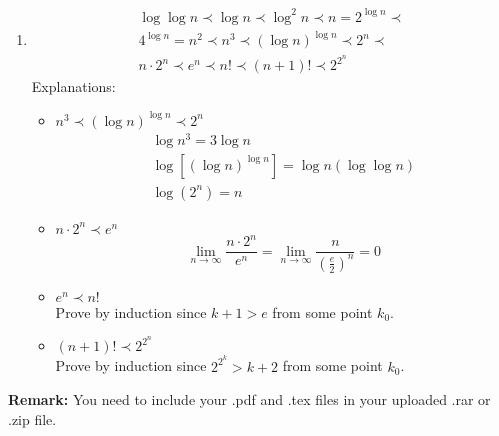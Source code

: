 \documentclass[12pt,a4paper]{article}
\makeatletter
\newtheorem*{solution}{Solution}
\theoremstyle{definition}
\renewenvironment{solution}[1][Solution] {\par\pushQED{\qed}\normalfont\topsep6\p@\@plus6\p@\relax\trivlist\item[\hskip\labelsep\bfseries#1\@addpunct{.}]\ignorespaces}{\popQED\endtrivlist\@endpefalse} \makeatother
\makeatother
\begin{document}
\begin{enumerate}
    \begin{solution}
    	\hfill \break
    	\begin{multline*}
	    	\log \log n \prec \log n \prec \log^2 n \prec n = 2^{\log n} \prec \\ 
	    	4^{\log n} = n^2 \prec n^3 \prec (\log n)^{\log n} \prec  2^n \prec \\
			n \cdot 2^n \prec e^n \prec n! \prec (n + 1)! \prec 2^{2^n}
    	\end{multline*}
    	Explanations: \\
    	\begin{itemize}
    		\item
    		$n^3 \prec (\log n)^{\log n} \prec  2^n$ \\
    		\begin{gather*}
    			\log n^3 = 3 \log n \\
    			\log [(\log n)^{\log n}] = \log n (\log \log n) \\
    			\log (2^n) = n 
    		\end{gather*}
    		
    		\item 
    		$n \cdot 2^n \prec e^n$ \\
    		\[
    			\lim_{n \to \infty} \frac{n \cdot 2^n}{e^n} = 
    			\lim_{n \to \infty} \frac{n}{(\frac{e}{2})^n} = 0
    		\]
    		\item
    		$e^n \prec n!$ \\
    		Prove by induction since $k + 1 > e$ from some point $k_0$. 
    		\item
    		$(n + 1)! \prec 2^{2^n}$ \\
    		Prove by induction since $2^{2^k} > k + 2$ from some point $k_0$. 
    	\end{itemize}
    	
    	
    \end{solution}

\end{enumerate}

\vspace{20pt}

\textbf{Remark:} You need to include your .pdf and .tex files in your uploaded .rar or .zip file.

\end{document}

